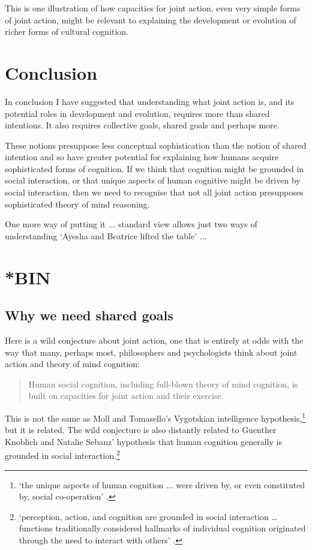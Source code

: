 \documentclass[14pt,a4paper]{extarticle}
\begin{document}
This is one illustration of how capacities for joint action, even very simple forms of joint action, might be relevant to explaining the development or evolution of richer forms of cultural cognition.



\section{Conclusion}
In conclusion I have suggested that understanding what joint action is, and its potential roles in development and evolution, requires more than shared intentions.  It also requires collective goals, shared goals and perhaps more.

These notions presuppose less conceptual sophistication than the notion of shared intention and so have greater potential for explaining how humans acquire sophisticated forms of cognition.  If we think that cognition might be grounded in social interaction, or that unique aspects of human cognitive might be driven by social interaction, then we need to recognise that not all joint action presupposes sophisticated theory of mind reasoning.

One more way of putting it ... standard view allows just two ways of understanding `Ayesha and Beatrice lifted the table' ...





\section{*BIN}

\subsection{Why we need shared goals}

Here is a wild conjecture about joint action, one that is entirely at odds with the way that many, perhaps most, philosophers and psychologists think about joint action and theory of mind cognition:

\begin{quote}
Human social cognition, including full-blown theory of mind cognition, is built on capacities for joint action and their exercise.
\end{quote}
%
This is not the same as Moll and Tomasello's Vygotskian intelligence hypothesis,\footnote{
`the unique aspects of human cognition ... were driven by, or even constituted by, social co-operation'
\citep[p.\ 1]{Moll:2007gu}.
}
 but it is related.  The wild conjecture is also distantly related to Guenther Knoblich and Natalie Sebanz' hypothesis that human cognition generally is grounded in social interaction.\footnote{
`perception, action, and cognition are grounded in social interaction … functions traditionally considered hallmarks of individual cognition originated through the need to interact with others' \citep[p.\ 103]{Knoblich:2006bn}.
 }
\end{document}
